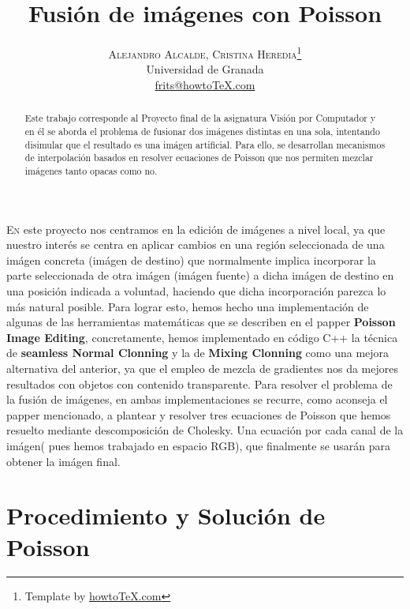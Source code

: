 \documentclass[oneside]{article}
\title{\vspace{-15mm}%
	\fontsize{24pt}{10pt}\selectfont
	\textbf{Fusión de imágenes con Poisson}
	}
\author{%
	\large
	\textsc{Alejandro Alcalde, Cristina Heredia}\thanks{Template by \href{http://www.howtotex.com}{howtoTeX.com}} \\[2mm]
	\normalsize	Universidad de Granada \\
	\normalsize	\href{mailto:frits@howtoTeX.com}{frits@howtoTeX.com}
	\vspace{-5mm}
	}
\date{}
\begin{document}
\maketitle
\thispagestyle{fancy}

\begin{abstract}
\noindent Este trabajo corresponde al Proyecto final de la asignatura Visión por Computador y en él se aborda el problema de fusionar dos imágenes
distintas en una sola, intentando disimular que el resultado es una imágen artificial. Para ello, se desarrollan mecanismos de interpolación
basados en resolver ecuaciones de Poisson que nos permiten mezclar imágenes tanto opacas como no.
\end{abstract}


\lettrine[nindent=0em,lines=3]{E}n este proyecto nos centramos en la edición de imágenes a nivel local, ya que nuestro interés se centra en aplicar
cambios en una región seleccionada de una imágen concreta (imágen de destino) que normalmente implica incorporar la parte seleccionada de otra imágen
(imágen fuente)  a dicha imágen de destino en una posición indicada a voluntad, haciendo que dicha incorporación parezca lo más natural posible. \newline \newline Para lograr esto, hemos hecho una implementación
de algunas de las herramientas matemáticas que se describen en el papper \textbf{Poisson Image Editing}, concretamente, hemos implementado en código C++ la técnica de  \textbf{seamless Normal Clonning} y la de \textbf{Mixing Clonning} como una mejora alternativa
del anterior, ya que el empleo de mezcla de gradientes nos da mejores resultados con objetos con contenido transparente. \newline Para resolver el problema de la fusión de imágenes, en ambas implementaciones
se recurre, como aconseja el papper mencionado, a plantear y resolver tres ecuaciones de Poisson que hemos resuelto mediante descomposición de Cholesky. Una ecuación por cada canal de la imágen( pues hemos trabajado en espacio RGB), que finalmente se usarán
para obtener la imágen final. \newline

\section{Procedimiento y Solución de Poisson}
\end{document}

